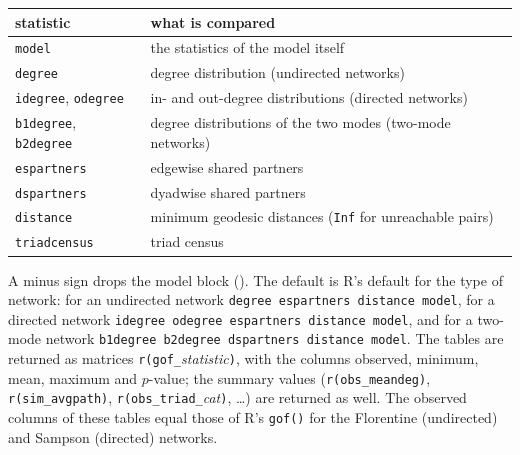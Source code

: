 \begin{center}\footnotesize
\begin{tabular}{@{}ll@{}}\toprule
statistic & what is compared\\\midrule
\texttt{model} & the statistics of the model itself\\
\texttt{degree} & degree distribution (undirected networks)\\
\texttt{idegree}, \texttt{odegree} & in- and out-degree distributions (directed networks)\\
\texttt{b1degree}, \texttt{b2degree} & degree distributions of the two modes (two-mode networks)\\
\texttt{espartners} & edgewise shared partners\\
\texttt{dspartners} & dyadwise shared partners\\
\texttt{distance} & minimum geodesic distances (\texttt{Inf} for unreachable pairs)\\
\texttt{triadcensus} & triad census\\\bottomrule
\end{tabular}
\end{center}
A minus sign drops the model block (). The default is R's default for the type of network: for an undirected network \texttt{degree espartners distance model}, for a directed network \texttt{idegree odegree espartners distance model}, and for a two-mode network \texttt{b1degree b2degree dspartners distance model}. The tables are returned as matrices \texttt{r(gof\_}\emph{statistic}\texttt{)}, with the columns observed, minimum, mean, maximum and $p$-value; the summary values (\texttt{r(obs\_meandeg)}, \texttt{r(sim\_avgpath)}, \texttt{r(obs\_triad\_}\emph{cat}\texttt{)}, \ldots) are returned as well. The observed columns of these tables equal those of R's \texttt{gof()} for the Florentine (undirected) and Sampson (directed) networks.

